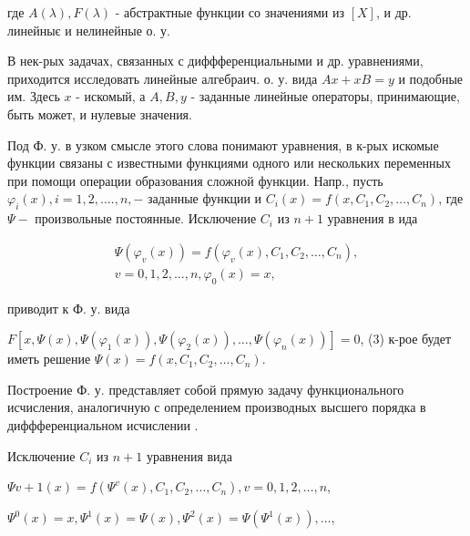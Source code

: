 \documentclass[10pt]{article}
\begin{document}
где $A(\lambda), F(\lambda)$ - абстрактные функции со значениями из $[X]$, и др. линейныє и нелинейные о. у.



В нек-рых задачах, связанных с диффференциальными и др. уравнениями, приходится исследовать линейные алгебраич. о. у. вида $A x+x B=y$ и подобные им. Здесь $x$ - искомый, а $A, B, y$ - заданные линейные операторы, принимающие, быть может, и нулевые значения.



Под Ф. у. в узком смысле этого слова понимают уравнения, в к-рых искомые функции связаны с известными функциями одного или нескольких переменных при помощи операции образования сложной функции. Напр., пусть $\varphi_{i}(x), i=1,2, \ldots ., n,-$ заданные функции и $C_{i}(x)=f\left(x, C_{1}, C_{2}, \ldots, C_{n}\right)$, где $\Psi-$ произвольные постоянные. Исключение $C_{i}$ из $n+1$ уравнения в ида



\[

\begin{gathered}

\Psi\left(\varphi_{v}(x)\right)=f\left(\varphi_{v}(x), C_{1}, C_{2}, \ldots, C_{n}\right), \\

v=0,1,2, \ldots, n, \varphi_{0}(x)=x,

\end{gathered}

\]



приводит к Ф. у. вида



$F\left[x, \Psi(x), \Psi\left(\varphi_{1}(x)\right), \Psi\left(\varphi_{2}(x)\right), \ldots, \Psi\left(\varphi_{n}(x)\right)\right]=0$, (3) к-рое будет иметь решение $\Psi(x)=f\left(x, C_{1}, C_{2}, \ldots, C_{n}\right)$.



Построение Ф. у. представляет собой прямую задачу функционального исчисления, аналогичную с определением производных высшего порядка в диффференциальном исчислении .



Исключение $C_{i}$ из $n+1$ уравнения вида



$\Psi v+1(x)=f\left(\Psi^{v}(x), C_{1}, C_{2}, \ldots, C_{n}\right), v=0,1,2, \ldots, n$,



$\Psi^{0}(x)=x, \Psi^{1}(x)=\Psi(x), \Psi^{2}(x)=\Psi\left(\Psi^{1}(x)\right), \ldots$,
\end{document}
